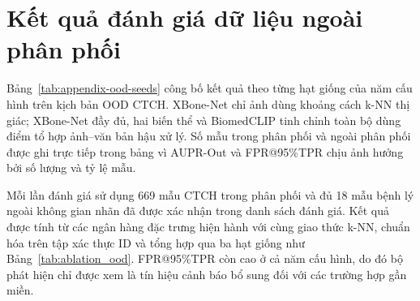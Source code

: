 





\section{Kết quả đánh giá dữ liệu ngoài phân phối}

Bảng~\ref{tab:appendix-ood-seeds} công bố kết quả theo từng hạt giống của năm cấu hình trên kịch bản OOD CTCH. XBone-Net chỉ ảnh dùng khoảng cách k-NN thị giác; XBone-Net đầy đủ, hai biến thể và BiomedCLIP tinh chỉnh toàn bộ dùng điểm tổ hợp ảnh--văn bản hậu xử lý. Số mẫu trong phân phối và ngoài phân phối được ghi trực tiếp trong bảng vì AUPR-Out và FPR@95\%TPR chịu ảnh hưởng bởi số lượng và tỷ lệ mẫu.

Mỗi lần đánh giá sử dụng 669 mẫu CTCH trong phân phối và đủ 18 mẫu bệnh lý ngoài không gian nhãn đã được xác nhận trong danh sách đánh giá. Kết quả được tính từ các ngân hàng đặc trưng hiện hành với cùng giao thức k-NN, chuẩn hóa trên tập xác thực ID và tổng hợp qua ba hạt giống như Bảng~\ref{tab:ablation_ood}. FPR@95\%TPR còn cao ở cả năm cấu hình, do đó bộ phát hiện chỉ được xem là tín hiệu cảnh báo bổ sung đối với các trường hợp gần miền.


